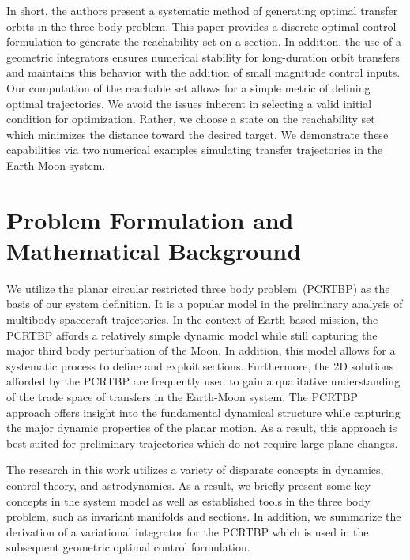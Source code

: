 \documentclass[smallcondensed]{svjour3}
\begin{document}
In short, the authors present a systematic method of generating optimal transfer orbits in the three-body problem.
This paper provides a discrete optimal control formulation to generate the reachability set on a \Poincare section.
In addition, the use of a geometric integrators ensures numerical stability for long-duration orbit transfers and maintains this behavior with the addition of small magnitude control inputs.
Our computation of the reachable set allows for a simple metric of defining optimal trajectories.
We avoid the issues inherent in selecting a valid initial condition for optimization.
Rather, we choose a state on the reachability set which minimizes the distance toward the desired target.
We demonstrate these capabilities via two numerical examples simulating transfer trajectories in the Earth-Moon system.

\section{Problem Formulation and Mathematical Background}\label{sec:background}

We utilize the planar circular restricted three body problem~(PCRTBP) as the basis of our system definition. 
It is a popular model in the preliminary analysis of multibody spacecraft trajectories. 
In the context of Earth based mission, the PCRTBP affords a relatively simple dynamic model while still capturing the major third body perturbation of the Moon.
In addition, this model allows for a systematic process to define and exploit \Poincare sections.
Furthermore, the 2D solutions afforded by the PCRTBP are frequently used to gain a qualitative understanding of the trade space of transfers in the Earth-Moon system.
The PCRTBP approach offers insight into the fundamental dynamical structure while capturing the major dynamic properties of the planar motion.
As a result, this approach is best suited for preliminary trajectories which do not require large plane changes.

The research in this work utilizes a variety of disparate concepts in dynamics, control theory, and astrodynamics. 
As a result, we briefly present some key concepts in the system model as well as established tools in the three body problem, such as invariant manifolds and \Poincare sections.
In addition, we summarize the derivation of a variational integrator for the PCRTBP which is used in the subsequent geometric optimal control formulation.
\end{document}
